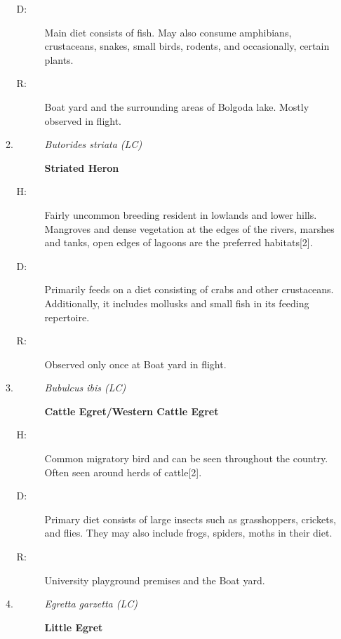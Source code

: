 \begin{itemize}
\begin{enumerate}
\begin{description}
\item[D: ]%
Main diet consists of fish. May also consume amphibians, crustaceans, snakes, small birds, rodents, and occasionally, certain plants.%
\item[R: ]%
Boat yard and the surrounding areas of Bolgoda lake. Mostly observed in flight.%
\end{description}%
\item%
\begin{description}%
\item[]%
\textit{Butorides striata (LC)}%
\item[]%
\textbf{Striated Heron}%
\end{description}%
\begin{description}%
\item[H: ]%
Fairly uncommon breeding resident in lowlands and lower hills. Mangroves and dense vegetation at the edges of the rivers, marshes and tanks, open edges of lagoons are the preferred habitats{[}2{]}.%
\item[D: ]%
Primarily feeds on a diet consisting of crabs and other crustaceans. Additionally, it includes mollusks and small fish in its feeding repertoire.%
\item[R: ]%
Observed only once at Boat yard in flight.%
\end{description}%
\item%
\begin{description}%
\item[]%
\textit{Bubulcus ibis (LC)}%
\item[]%
\textbf{Cattle Egret/Western Cattle Egret}%
\end{description}%
\begin{description}%
\item[H: ]%
Common migratory bird and can be seen throughout the country. Often seen around herds of cattle{[}2{]}.%
\item[D: ]%
Primary diet consists of large insects such as grasshoppers, crickets, and flies. They may also include frogs, spiders, moths in their diet.%
\item[R: ]%
University playground premises and the Boat yard.%
\end{description}%
\item%
\begin{description}%
\item[]%
\textit{Egretta garzetta (LC)}%
\item[]%
\textbf{Little Egret}%
\end{description}%

\end{enumerate}
\end{itemize}
